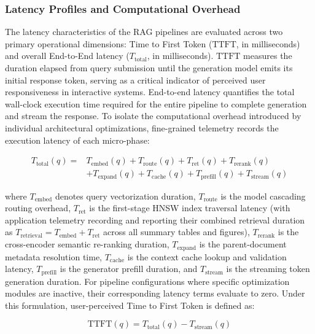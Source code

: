\subsubsection{Latency Profiles and Computational Overhead}
\label{sec:latency}

The latency characteristics of the RAG pipelines are evaluated across two primary operational dimensions: Time to First Token ($\text{TTFT}$, in milliseconds) and overall End-to-End latency ($T_{\text{total}}$, in milliseconds). $\text{TTFT}$ measures the duration elapsed from query submission until the generation model emits its initial response token, serving as a critical indicator of perceived user responsiveness in interactive systems. End-to-end latency quantifies the total wall-clock execution time required for the entire pipeline to complete generation and stream the response. To isolate the computational overhead introduced by individual architectural optimizations, fine-grained telemetry records the execution latency of each micro-phase:

\begin{equation}
\label{eq:latency}
\begin{split}
T_{\text{total}}(q) ={} & T_{\text{embed}}(q) + T_{\text{route}}(q) + T_{\text{ret}}(q) + T_{\text{rerank}}(q) \\
& + T_{\text{expand}}(q) + T_{\text{cache}}(q) + T_{\text{prefill}}(q) + T_{\text{stream}}(q)
\end{split}
\end{equation}

where $T_{\text{embed}}$ denotes query vectorization duration, $T_{\text{route}}$ is the model cascading routing overhead, $T_{\text{ret}}$ is the first-stage HNSW index traversal latency (with application telemetry recording and reporting their combined retrieval duration as $T_{\text{retrieval}} = T_{\text{embed}} + T_{\text{ret}}$ across all summary tables and figures), $T_{\text{rerank}}$ is the cross-encoder semantic re-ranking duration, $T_{\text{expand}}$ is the parent-document metadata resolution time, $T_{\text{cache}}$ is the context cache lookup and validation latency, $T_{\text{prefill}}$ is the generator prefill duration, and $T_{\text{stream}}$ is the streaming token generation duration. For pipeline configurations where specific optimization modules are inactive, their corresponding latency terms evaluate to zero. Under this formulation, user-perceived Time to First Token is defined as:

\begin{equation}
\label{eq:ttft}
\text{TTFT}(q) = T_{\text{total}}(q) - T_{\text{stream}}(q)
\end{equation}

